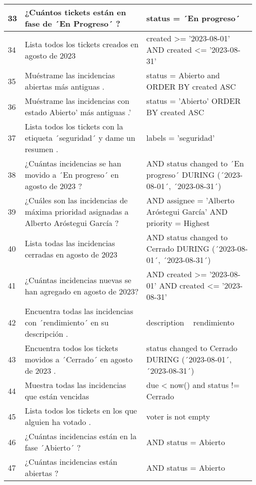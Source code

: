 \begin{center}
\begin{longtable}{ | p{1cm} | p{8cm} | p{6cm} | }
        \hline
        33 & ¿Cuántos tickets están en fase de ´En Progreso´ ? & status = ´En progreso´   \\
        \hline
        34 & Lista todos los tickets creados en agosto de 2023  & created >= '2023-08-01' AND created <= '2023-08-31'   \\
        \hline
        35 & Muéstrame las incidencias abiertas más antiguas . & status = Abierto and ORDER BY created ASC \\
        \hline
        36 & Muéstrame las incidencias con estado Abierto' más antiguas .' & status = 'Abierto' ORDER BY created ASC \\
        \hline
        37 & Lista todos los tickets con la etiqueta ´seguridad´ y dame un resumen . & labels = 'seguridad' \\
        \hline
        38 & ¿Cuántas incidencias se han movido a ´En progreso´ en agosto de 2023 ? &  AND status changed to ´En progreso´ DURING (´2023-08-01´, ´2023-08-31´) \\
        \hline
        39 & ¿Cuáles son las incidencias de máxima prioridad asignadas a Alberto Aróstegui García ? &  AND assignee = 'Alberto Aróstegui García' AND priority = Highest \\
        \hline
        40 & Lista todas las incidencias cerradas en agosto de 2023  &  AND status changed to Cerrado DURING (´2023-08-01´, ´2023-08-31´) \\
        \hline
        41 & ¿Cuántas incidencias nuevas se han agregado en agosto de 2023? &  AND created >= '2023-08-01' AND created <= '2023-08-31' \\
        \hline
        42 & Encuentra todas las incidencias con ´rendimiento´ en su descripción . & description ~ rendimiento \\
        \hline
        43 & Encuentra todos los tickets movidos a ´Cerrado´ en agosto de 2023 . & status changed to Cerrado DURING (´2023-08-01´, ´2023-08-31´) \\
        \hline
        44 & Muestra todas las incidencias que están vencidas  & due < now() and status != Cerrado \\
        \hline
        45 & Lista todos los tickets en los que alguien ha votado . & voter is not empty   \\
        \hline
        46 & ¿Cuántas incidencias están en la fase ´Abierto´ ? &  AND status = Abierto \\
        \hline
        47 & ¿Cuántas incidencias están abiertas ? &  AND status = Abierto \\

\end{longtable}
\end{center}
